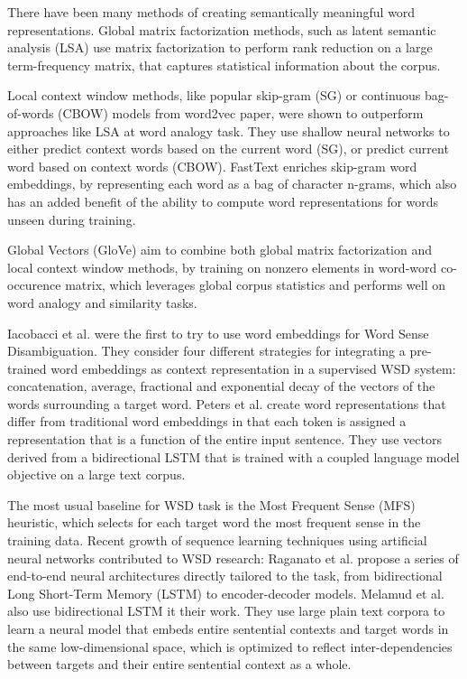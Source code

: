 \documentclass{llncs}
\begin{document}
There have been many methods of creating semantically meaningful word representations.
Global matrix factorization methods, such as latent semantic analysis (LSA)\cite{LSA} use matrix factorization to perform rank reduction on a large term-frequency matrix, that captures statistical information about the corpus.

Local context window methods, like popular skip-gram (SG) or continuous bag-of-words (CBOW) models from word2vec paper\cite{word2vec}, were shown to outperform approaches like LSA at word analogy task.
They use shallow neural networks to either predict context words based on the current word (SG), or predict current word based on context words (CBOW).
FastText\cite{fastText} enriches skip-gram word embeddings, by representing each word as a bag of character n-grams, which also has an added benefit of the ability to compute word representations for words unseen during training.

Global Vectors (GloVe)\cite{GloVe} aim to combine both global matrix factorization and local context window methods, by training on nonzero elements in word-word co-occurence matrix, which leverages global corpus statistics and performs well on word analogy and similarity tasks.

Iacobacci et al.\cite{embeddingsforWSD} were the first to try to use word embeddings for Word Sense Disambiguation.
They consider four different strategies for integrating a pre-trained word embeddings as context representation in a supervised WSD system: concatenation, average, fractional and exponential decay of the vectors of the words surrounding a target word.
Peters et al.\cite{deepcontext} create word representations that differ from traditional word embeddings in that each token is assigned a representation that is a function of the entire input sentence. They use vectors derived from a bidirectional LSTM that is trained with a coupled language model objective on a large text corpus.

The most usual baseline for WSD task is the Most Frequent Sense\cite{evalmfs} (MFS) heuristic, which selects for each target word the most frequent sense in the training data.
Recent growth of sequence learning techniques using artificial neural networks contributed to WSD research: Raganato et al.\cite{neuralseqmodelingforWSD} propose a series of end-to-end neural architectures directly tailored to the task, from bidirectional Long Short-Term Memory (LSTM) to encoder-decoder models.
Melamud et al.\cite{context2vec} also use bidirectional LSTM it their work. They use large plain text corpora to learn a neural model that embeds entire sentential contexts and target words in the same low-dimensional space, which is optimized to reflect inter-dependencies between targets and their entire sentential context as a whole.
\end{document}
